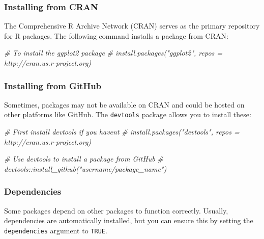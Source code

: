 \documentclass[
]{book}
\newenvironment{Shaded}{\begin{snugshade}}{\end{snugshade}}
\newcommand{\CommentTok}[1]{\textcolor[rgb]{0.56,0.35,0.01}{\textit{#1}}}
\begin{document}
\hypertarget{installing-from-cran}{%
\subsubsection*{Installing from CRAN}\label{installing-from-cran}}

The Comprehensive R Archive Network (CRAN) serves as the primary repository for R packages. The following command installs a package from CRAN:

\begin{Shaded}
\begin{Highlighting}[]
\CommentTok{\# To install the ggplot2 package}
\CommentTok{\# install.packages("ggplot2", repos = \textquotesingle{}http://cran.us.r{-}project.org\textquotesingle{})}
\end{Highlighting}
\end{Shaded}

\hypertarget{installing-from-github}{%
\subsubsection*{Installing from GitHub}\label{installing-from-github}}

Sometimes, packages may not be available on CRAN and could be hosted on other platforms like GitHub. The \texttt{devtools} package allows you to install these:

\begin{Shaded}
\begin{Highlighting}[]
\CommentTok{\# First install devtools if you haven\textquotesingle{}t}
\CommentTok{\# install.packages("devtools", repos = \textquotesingle{}http://cran.us.r{-}project.org\textquotesingle{})}

\CommentTok{\# Use devtools to install a package from GitHub}
\CommentTok{\# devtools::install\_github("username/package\_name")}
\end{Highlighting}
\end{Shaded}

\hypertarget{dependencies}{%
\subsubsection*{Dependencies}\label{dependencies}}

Some packages depend on other packages to function correctly. Usually, dependencies are automatically installed, but you can ensure this by setting the \texttt{dependencies} argument to \texttt{TRUE}.
\end{document}
